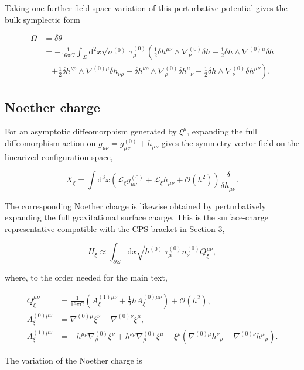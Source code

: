 Taking one further field-space variation of this perturbative potential gives the bulk symplectic form

\begin{align}
\Omega&=\delta\theta\\
&=-\frac{1}{16\pi G}\int_\Sigma \mathrm{d}^2x\sqrt{\sigma^{(0)}}\,\tau^{(0)}_\mu\left(\frac{1}{2}\delta h^{\mu\nu}\wedge\nabla^{(0)}_\nu\delta h-\frac{1}{2}\delta h\wedge\nabla^{(0)\mu}\delta h\right.\\
&\quad\left.+\frac{1}{2}\delta h^{\nu\rho}\wedge\nabla^{(0)\mu}\delta h_{\nu\rho}-\delta h^{\nu\rho}\wedge\nabla^{(0)}_\rho\delta h^\mu{}_\nu+\frac{1}{2}\delta h\wedge\nabla^{(0)}_\nu\delta h^{\mu\nu}\right).
\end{align}

\subsection{Noether charge}\label{noether-charge}

For an asymptotic diffeomorphism generated by \(\xi^\mu\), expanding the full diffeomorphism action on \(g_{\mu\nu}=g^{(0)}_{\mu\nu}+h_{\mu\nu}\) gives the symmetry vector field on the linearized configuration space,

\[
X_\xi=\int\mathrm{d}^3x\left(\mathcal{L}_\xi g^{(0)}_{\mu\nu}+\mathcal{L}_\xi h_{\mu\nu}+\mathcal{O}(h^2)\right)\frac{\delta}{\delta h_{\mu\nu}}.
\]

The corresponding Noether charge is likewise obtained by perturbatively expanding the full gravitational surface charge. This is the surface-charge representative compatible with the CPS bracket in Section 3,

\[
H_\xi\approx\int_{\partial\Sigma}\mathrm{d}x\sqrt{h^{(0)}}\,\tau^{(0)}_\mu n^{(0)}_\nu Q_\xi^{\mu\nu},
\]

where, to the order needed for the main text,

\begin{align}
Q_\xi^{\mu\nu}&=\frac{1}{16\pi G}\left(A_\xi^{(1)\mu\nu}+\frac{1}{2}hA_\xi^{(0)\mu\nu}\right)+\mathcal{O}(h^2),\\
A_\xi^{(0)\mu\nu}&=\nabla^{(0)\mu}\xi^\nu-\nabla^{(0)\nu}\xi^\mu,\\
A_\xi^{(1)\mu\nu}&=-h^{\mu\rho}\nabla^{(0)}_\rho\xi^\nu+h^{\nu\rho}\nabla^{(0)}_\rho\xi^\mu+\xi^\rho\left(\nabla^{(0)\mu}h^\nu{}_\rho-\nabla^{(0)\nu}h^\mu{}_\rho\right).
\end{align}

The variation of the Noether charge is

